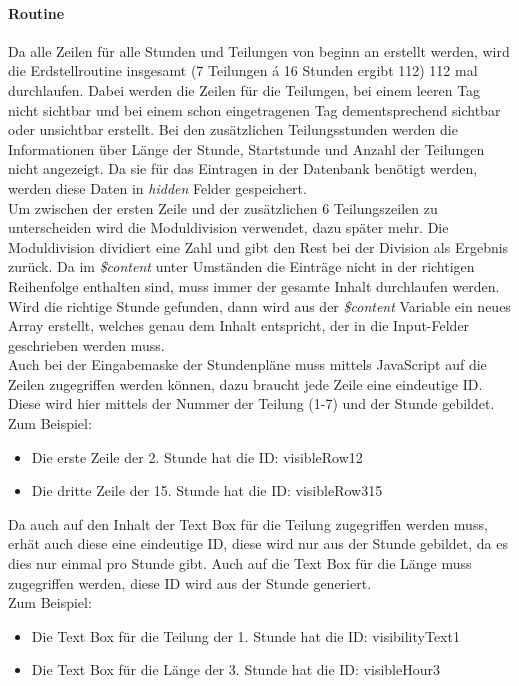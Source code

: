 \paragraph{Routine}
Da alle Zeilen für alle Stunden und Teilungen von beginn an erstellt werden, wird die Erdstellroutine insgesamt (7 Teilungen \'{a} 16 Stunden ergibt 112) 112 mal durchlaufen. Dabei werden die Zeilen für die Teilungen, bei einem leeren Tag nicht sichtbar und bei einem schon eingetragenen Tag dementsprechend sichtbar oder unsichtbar erstellt. Bei den zusätzlichen Teilungsstunden werden die Informationen über Länge der Stunde, Startstunde und Anzahl der Teilungen nicht angezeigt. Da sie für das Eintragen in der Datenbank benötigt werden, werden diese Daten in \textit{hidden} Felder gespeichert.\\
Um zwischen der ersten Zeile und der zusätzlichen 6 Teilungszeilen zu unterscheiden wird die Moduldivision verwendet, dazu später mehr. Die Moduldivision dividiert eine Zahl und gibt den Rest bei der Division als Ergebnis zurück. Da im \textit{\$content} unter Umständen die Einträge nicht in der richtigen Reihenfolge enthalten sind, muss immer der gesamte Inhalt durchlaufen werden. Wird die richtige Stunde gefunden, dann wird aus der \textit{\$content} Variable ein neues Array erstellt, welches genau dem Inhalt entspricht, der in die Input-Felder geschrieben werden muss.\\
Auch bei der Eingabemaske der Stundenpläne muss mittels JavaScript auf die Zeilen zugegriffen werden können, dazu braucht jede Zeile eine eindeutige ID. Diese wird hier mittels der Nummer der Teilung (1-7) und der Stunde gebildet.\\ 
Zum Beispiel:
\begin{itemize}
	\item Die erste Zeile der 2. Stunde hat die ID: visibleRow12
	\item Die dritte Zeile der 15. Stunde hat die ID: visibleRow315
\end{itemize}
Da auch auf den Inhalt der Text Box für die Teilung zugegriffen werden muss, erhät auch diese eine eindeutige ID, diese wird nur aus der Stunde gebildet, da es dies nur einmal pro Stunde gibt. Auch auf die Text Box für die Länge muss zugegriffen werden, diese ID wird aus der Stunde generiert.\\
Zum Beispiel:
\begin{itemize}
	\item Die Text Box für die Teilung der 1. Stunde hat die ID: visibilityText1
	\item Die Text Box für die Länge der 3. Stunde hat die ID: visibleHour3
\end{itemize}
